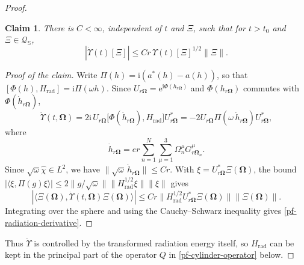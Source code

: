 \documentclass[final,reqno]{amsart}
\newtheorem*{claim}{Claim}
\theoremstyle{remark}
\renewcommand{\i}{\mathrm{i}}
\newcommand{\e}{\mathrm{e}}
\newcommand{\dua}[2]{\langle #1, #2 \rangle}
\newcommand{\rad}{\mathrm{rad}}
\newcommand{\vOmega}{{\bm{\Omega}}}
\newcommand{\wh}[1]{\widehat{#1}}
\begin{document}
\begin{proof}
\begin{claim}
There is $C<\infty$, independent of $t$ and $\Xi$, such that for
$t>t_0$ and $\Xi\in\mathcal Q_{\mathbb S}$,
\begin{equation}\label{pf-radiation-derivative}
 |\dot\Upsilon(t)[\Xi]|\leq Cr\,\Upsilon(t)[\Xi]^{1/2}\|\Xi\|.
\end{equation}
\end{claim}

\begin{proof}[Proof of the claim]
Write $\varPi(h)=\i(a^*(h)-a(h))$, so that
$[\varPhi(h),H_\rad]=\i\varPi(\omega h)$.  Since
$U_{r\vOmega}=\e^{\i\varPhi(h_{r\vOmega})}$ and $\varPhi(h_{r\vOmega})$ commutes with
$\varPhi(\dot h_{r\vOmega})$,
\[
 \dot\Upsilon(t,\vOmega)
 =2\i\,U_{r\vOmega}\big[\varPhi(\dot h_{r\vOmega}),H_\rad\big]U_{r\vOmega}^*
 =-2U_{r\vOmega}\varPi(\omega\,\dot h_{r\vOmega})U_{r\vOmega}^*,
\]
where
\[
 \dot h_{r\vOmega}
       =er\sum_{n=1}^N\sum_{\mu=1}^3\Omega_n^\mu G^\mu_{r\vOmega_n}.
\]
Since $\sqrt\omega\wh\chi\in L^2$, we have
$\|\sqrt\omega\,\dot h_{r\vOmega}\|\leq Cr$.  With
$\xi=U_{r\vOmega}^*\Xi(\vOmega)$, the bound
$|\dua{\xi}{\varPi(g)\xi}|\leq2\|g/\sqrt\omega\|\|H_\rad^{1/2}\xi\|\|\xi\|$
gives
\[
 |\dua{\Xi(\vOmega)}{\dot\Upsilon(t,\vOmega)\Xi(\vOmega)}|
 \leq Cr\|H_\rad^{1/2}U_{r\vOmega}^*\Xi(\vOmega)\|\|\Xi(\vOmega)\|.
\]
Integrating over the sphere and using the Cauchy--Schwarz inequality
gives \cref{pf-radiation-derivative}.
\end{proof}

Thus $\dot\Upsilon$ is controlled by the transformed radiation energy
itself, so $H_\rad$ can be kept in the principal part of the operator
$Q$ in \cref{pf-cylinder-operator} below.


\end{proof}
\end{document}
